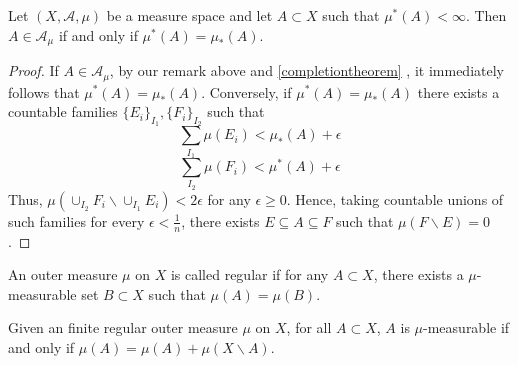\documentclass[main.tex]{subfiles}
\begin{document}
\begin{theorem}
 Let $(X,\mathcal{A},\mu)$ be a measure space and let $A \subset X$ such that $\mu^*(A) < \infty$. Then $A \in \mathcal{A}_{\mu}$ if and only if $\mu^*(A) = \mu_*(A)$. 
\end{theorem}

\begin{proof}
If $A \in \mathcal{A}_{\mu}$, by our remark above and \ref{completiontheorem} , it immediately follows that $\mu^*(A) = \mu_*(A)$. Conversely, if $\mu^*(A) = \mu_*(A)$ there exists a countable families $\{E_i\}_{I_1},\{F_i\}_{I_2}$ such that
$$\sum_{I_1} \mu(E_i) < \mu_*(A) + \epsilon $$
$$\sum_{I_2} \mu(F_i) < \mu^*(A) + \epsilon  $$ 
Thus, $\mu(\cup_{I_2} F_i \backslash \cup_{I_1} E_i) < 2\epsilon$ for any $\epsilon \geq 0$. Hence, taking countable unions of such families for every $\epsilon < \frac{1}{n}$, there exists $E \subseteq A \subseteq F$ such that $\mu(F\backslash E) = 0$. 
\end{proof}

\begin{definition}
An outer measure $\mu$ on $X$ is called regular if for any $A \subset X$, there exists a $\mu$-measurable set $B \subset X$ such that $\mu(A) = \mu(B)$. 
\end{definition} 

\begin{theorem}
Given an finite regular outer measure $\mu$ on $X$, for all $A \subset X$, $A$ is $\mu$-measurable if and only if $\mu(A) = \mu(A) + \mu(X \backslash A)$. 
\end{theorem}
\end{document}
